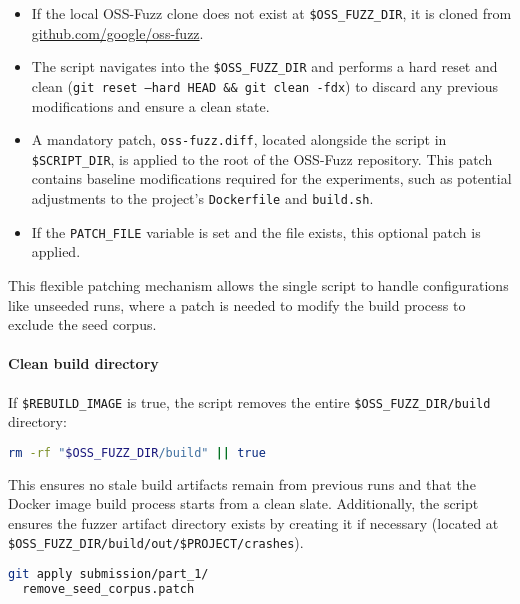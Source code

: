 \documentclass[11pt,a4paper,twocolumn]{article}
\begin{document}
\begin{itemize}
	\item If the local OSS-Fuzz clone does not exist at \texttt{\$OSS\_FUZZ\_DIR}, it is cloned from \href{https://github.com/google/oss-fuzz.git}{github.com/google/oss-fuzz}.
	\item The script navigates into the \texttt{\$OSS\_FUZZ\_DIR} and performs a hard reset and clean (\texttt{git reset --hard HEAD \&\& git clean -fdx}) to discard any previous modifications and ensure a clean state.
	\item A mandatory patch, \texttt{oss-fuzz.diff}, located alongside the script in \texttt{\$SCRIPT\_DIR}, is applied to the root of the OSS-Fuzz repository. This patch contains baseline modifications required for the experiments, such as potential adjustments to the project's \texttt{Dockerfile} and \texttt{build.sh}.
	\item If the \texttt{PATCH\_FILE} variable is set and the file exists, this optional patch is applied.
\end{itemize}

This flexible patching mechanism allows the single script to handle configurations like unseeded runs, where a patch is needed to modify the build process to exclude the seed corpus.

\noindent \paragraph{Clean build directory} \label{sec:methodology_clean} If \texttt{\$REBUILD\_IMAGE} is true, the script removes the entire \texttt{\$OSS\_FUZZ\_DIR/build} directory:
\begin{lstlisting}[language=bash, caption={Bash script to clean the OSS-Fuzz build directory with error handling}]
rm -rf "$OSS_FUZZ_DIR/build" || true
\end{lstlisting}

This ensures no stale build artifacts remain from previous runs and that the Docker image build process starts from a clean slate. Additionally, the script ensures the fuzzer artifact directory exists by creating it if necessary (located at \texttt{\$OSS\_FUZZ\_DIR/build/out/\$PROJECT/crashes}).

\begin{lstlisting}[language=bash, caption={Bash script to apply the patch to remove the seed corpus from the Docker image and build script}]
git apply submission/part_1/
  remove_seed_corpus.patch
\end{lstlisting}
\end{document}
